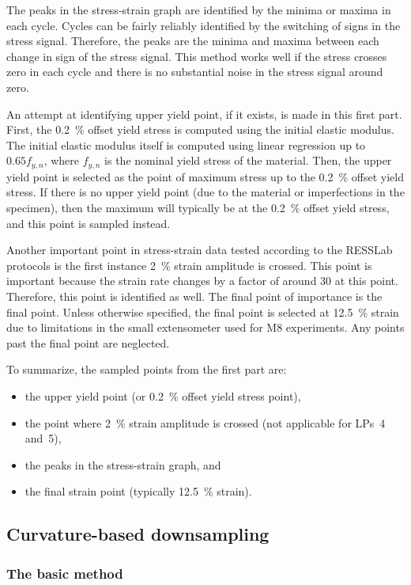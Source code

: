 \documentclass[a4paper,11pt]{article}
\begin{document}
The peaks in the stress-strain graph are identified by the minima or maxima in each cycle.
Cycles can be fairly reliably identified by the switching of signs in the stress signal.
Therefore, the peaks are the minima and maxima between each change in sign of the stress signal.
This method works well if the stress crosses zero in each cycle and there is no substantial noise in the stress signal around zero.

An attempt at identifying upper yield point, if it exists, is made in this first part.
First, the 0.2~\% offset yield stress is computed using the initial elastic modulus.
The initial elastic modulus itself is computed using linear regression up to $0.65 f_{y,n}$, where $f_{y,n}$ is the nominal yield stress of the material.
Then, the upper yield point is selected as the point of maximum stress up to the 0.2~\% offset yield stress.
If there is no upper yield point (due to the material or imperfections in the specimen), then the maximum will typically be at the 0.2~\% offset yield stress, and this point is sampled instead.

Another important point in stress-strain data tested according to the RESSLab protocols is the first instance 2~\% strain amplitude is crossed.
This point is important because the strain rate changes by a factor of around 30 at this point.
Therefore, this point is identified as well.
The final point of importance is the final point.
Unless otherwise specified, the final point is selected at 12.5~\% strain due to limitations in the small extensometer used for M8 experiments.
Any points past the final point are neglected.

To summarize, the sampled points from the first part are:
\begin{itemize}
    \item the upper yield point (or 0.2~\% offset yield stress point),
    \item the point where 2~\% strain amplitude is crossed (not applicable for LPs~4 and~5),
    \item the peaks in the stress-strain graph, and
    \item the final strain point (typically 12.5~\% strain).
\end{itemize}

\subsection{Curvature-based downsampling}

\subsubsection{The basic method}
\end{document}

